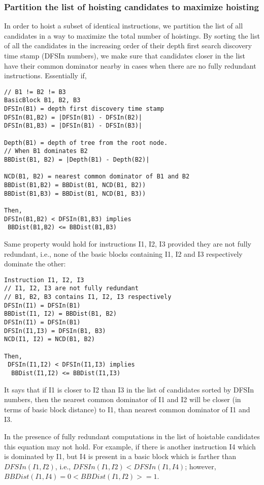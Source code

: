 \documentclass{sig-alternate}
\begin{document}
\subsubsection{Partition the list of hoisting candidates to maximize hoisting}
\label{subsec:partition}
In order to hoist a subset of identical instructions, we partition the list of
all candidates in a way to maximize the total number of hoistings.  By sorting
the list of all the candidates in the increasing order of their depth first
search discovery time stamp \cite{clrs} (DFSIn numbers), we make sure that
candidates closer in the list have their common dominator nearby in cases when
there are no fully redundant instructions. Essentially if,

\begin{verbatim}
// B1 != B2 != B3
BasicBlock B1, B2, B3
DFSIn(B1) = depth first discovery time stamp
DFSIn(B1,B2) = |DFSIn(B1) - DFSIn(B2)|
DFSIn(B1,B3) = |DFSIn(B1) - DFSIn(B3)|

Depth(B1) = depth of tree from the root node.
// When B1 dominates B2
BBDist(B1, B2) = |Depth(B1) - Depth(B2)|

NCD(B1, B2) = nearest common dominator of B1 and B2
BBDist(B1,B2) = BBDist(B1, NCD(B1, B2))
BBDist(B1,B3) = BBDist(B1, NCD(B1, B3))

Then,
DFSIn(B1,B2) < DFSIn(B1,B3) implies
 BBDist(B1,B2) <= BBDist(B1,B3)
\end{verbatim}

Same property would hold for instructions I1, I2, I3 provided they are not fully
redundant, i.e., none of the basic blocks containing I1, I2 and I3 respectively
dominate the other:

\begin{verbatim}
Instruction I1, I2, I3
// I1, I2, I3 are not fully redundant
// B1, B2, B3 contains I1, I2, I3 respectively
DFSIn(I1) = DFSIn(B1)
BBDist(I1, I2) = BBDist(B1, B2)
DFSIn(I1) = DFSIn(B1)
DFSIn(I1,I3) = DFSIn(B1, B3)
NCD(I1, I2) = NCD(B1, B2)

Then,
 DFSIn(I1,I2) < DFSIn(I1,I3) implies
  BBDist(I1,I2) <= BBDist(I1,I3)
\end{verbatim}

It says that if I1 is closer to I2 than I3 in the list of candidates sorted by
DFSIn numbers, then the nearest common dominator of I1 and I2 will be closer (in
terms of basic block distance) to I1, than nearest common dominator of I1 and
I3.

In the presence of fully redundant computations in the list of hoistable
candidates this equation may not hold. For example, if there is another
instruction I4 which is dominated by I1, but I4 is present in a basic block
which is farther than $DFSIn(I1, I2)$, i.e., $DFSIn(I1,I2) < DFSIn(I1,I4)$;
however, $BBDist(I1,I4) = 0 < BBDist(I1,I2) >=1$.
\end{document}
